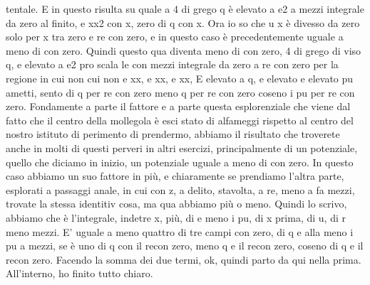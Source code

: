 \begin{soluzione}
{tentale. E in questo risulta su quale a 4 di grego q è elevato a e2 a mezzi integrale da zero al finito, e xx2 con x, zero di q con x. Ora io so che u x è divesso da zero solo per x tra zero e re con zero, e in questo caso è precedentemente uguale a meno di con zero. Quindi questo qua diventa meno di con zero, 4 di grego di viso q, e elevato a e2 pro scala le con mezzi integrale da zero a re con zero per la regione in cui non cui non e xx, e xx, e xx, E elevato a q, e elevato e elevato pu ametti, sento di q per re con zero meno q per re con zero coseno i pu per re con zero. Fondamente a parte il fattore e a parte questa esplorenziale che viene dal fatto che il centro della mollegola è esci stato di alfameggi rispetto al centro del nostro istituto di perimento di prendermo, abbiamo il risultato che troverete anche in molti di questi perveri in altri esercizi, principalmente di un potenziale, quello che diciamo in inizio, un potenziale uguale a meno di con zero. In questo caso abbiamo un suo fattore in più, e chiaramente se prendiamo l'altra parte, esplorati a passaggi anale, in cui con z, a delito, stavolta, a re, meno a fa mezzi, trovate la stessa identitiv cosa, ma qua abbiamo più o meno. Quindi lo scrivo, abbiamo che è l'integrale, indetre x, più, di e meno i pu, di x prima, di u, di r meno mezzi. E' uguale a meno quattro di tre campi con zero, di q e alla meno i pu a mezzi, se è uno di q con il recon zero, meno q e il recon zero, coseno di q e il recon zero. Facendo la somma dei due termi, ok, quindi parto da qui nella prima. All'interno, ho finito tutto chiaro. 
   
}
\end{soluzione}
